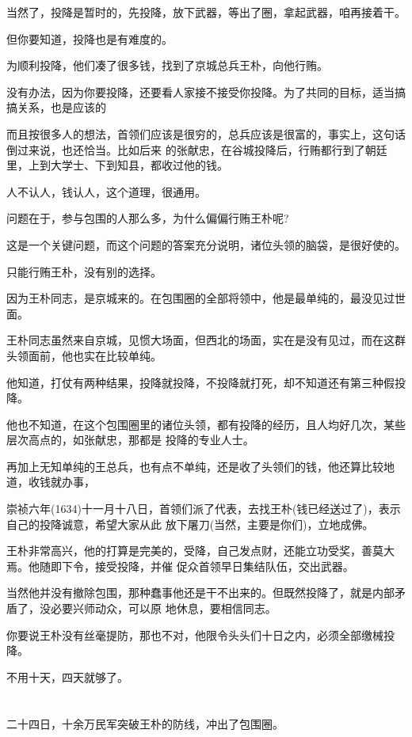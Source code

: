 \documentclass[11pt,a4paper,onecolumn]{article}
\begin{document}
当然了，投降是暂时的，先投降，放下武器，等出了圈，拿起武器，咱再接着干。

但你要知道，投降也是有难度的。

为顺利投降，他们凑了很多钱，找到了京城总兵王朴，向他行贿。

没有办法，因为你要投降，还要看人家接不接受你投降。为了共同的目标，适当搞搞关系，也是应该的

而且按很多人的想法，首领们应该是很穷的，总兵应该是很富的，事实上，这句话倒过来说，也还恰当。比如后来
的张献忠，在谷城投降后，行贿都行到了朝廷里，上到大学士、下到知县，都收过他的钱。

人不认人，钱认人，这个道理，很通用。

问题在于，参与包围的人那么多，为什么偏偏行贿王朴呢?

这是一个关键问题，而这个问题的答案充分说明，诸位头领的脑袋，是很好使的。

只能行贿王朴，没有别的选择。

因为王朴同志，是京城来的。在包围圈的全部将领中，他是最单纯的，最没见过世面。

王朴同志虽然来自京城，见惯大场面，但西北的场面，实在是没有见过，而在这群头领面前，他也实在比较单纯。

他知道，打仗有两种结果，投降就投降，不投降就打死，却不知道还有第三种\myrule 假投降。

他也不知道，在这个包围圈里的诸位头领，都有投降的经历，且人均好几次，某些层次高点的，如张献忠，那都是
投降的专业人士。

再加上无知单纯的王总兵，也有点不单纯，还是收了头领们的钱，他还算比较地道，收钱就办事，

崇祯六年(1634)十一月十八日，首领们派了代表，去找王朴(钱已经送过了)，表示自己的投降诚意，希望大家从此
放下屠刀(当然，主要是你们)，立地成佛。

王朴非常高兴，他的打算是完美的，受降，自己发点财，还能立功受奖，善莫大焉。他随即下令，接受投降，并催
促众首领早日集结队伍，交出武器。

当然他并没有撤除包围，那种蠢事他还是干不出来的。但既然投降了，就是内部矛盾了，没必要兴师动众，可以原
地休息，要相信同志。

你要说王朴没有丝毫提防，那也不对，他限令头头们十日之内，必须全部缴械投降。

不用十天，四天就够了。

\section[\thesection]{}

二十四日，十余万民军突破王朴的防线，冲出了包围圈。
\end{document}
